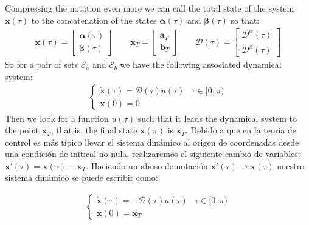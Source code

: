 Compressing the notation even more we can call the total state of the system $ \bm {x} (\tau) $ to the concatenation of the states $ \bm {\alpha} (\tau) $ and $ \bm {\beta} ( \tau) $ so that:
\begin{gather}
    \bm{x}(\tau) = \begin{bmatrix}
        \bm{\alpha}(\tau) \\  \bm{\beta}(\tau)
    \end{bmatrix} \hspace{2em}
    \bm{x}_T = \begin{bmatrix}
        \bm{a}_T \\  \bm{b}_T
    \end{bmatrix} \hspace{2em}
    \bm{\mathcal{D}}(\tau) = \begin{bmatrix}
        \bm{\mathcal{D}}^\alpha(\tau) \\  
        \bm{\mathcal{D}}^\beta(\tau)
    \end{bmatrix}     
\end{gather}
So for a pair of sets $ \mathcal {E} _a $ and $ \mathcal {E} _b $ we have the following associated dynamical system:
\begin{gather}
    \begin{cases}
        \dot{\bm{x}}(\tau) = \bm{\mathcal{D}}(\tau) u(\tau)  & \tau \in [0,\pi)\\
        \bm{x}(0) = {0}
    \end{cases}
\end{gather}
Then we look for a function $ u (\tau) $ such that it leads the dynamical system to the point $ \bm {x} _T $, that is, the final state $ \bm {x} (\pi) $ is $ \bm {x}_T $. Debido a que en la teoría de control es más típico llevar el sistema dinámico al origen de coordenadas desde una condición de initical no nula, realizaremos el siguiente cambio de variables: $\bm{x}'(\tau) = \bm{x}(\tau) - \bm{x}_T$. Haciendo un abuso de notación $\bm{x}'(\tau) \rightarrow \bm{x}(\tau)$  nuestro sistema dinámico se puede escribir como:

\begin{gather}
    \begin{cases}
        \dot{\bm{x}}(\tau) = -\bm{\mathcal{D}}(\tau) u(\tau)  & \tau \in [0,\pi)\\
        \bm{x}(0) = \bm{x}_T
    \end{cases}
\end{gather}

